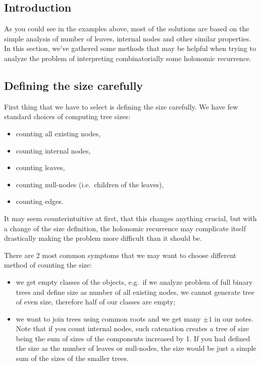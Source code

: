 \documentclass[final]{article}
\theoremstyle{definition}
\theoremstyle{remark}
\begin{document}
\subsection{Introduction}%
\label{sub:introduction}

As you could see in the examples above, most of the solutions are based on the simple analysis of number of leaves, internal nodes and other similar properties. In this section, we've gathered some methods that may be helpful when trying to analyze the problem of interpreting combinatorially some holonomic recurrence.

\subsection{Defining the size carefully}%
\label{sub:defining_the_size_carefully}

First thing that we have to select is defining the size carefully. We have few standard choices of computing tree sizes:
\begin{itemize}
    \item counting all existing nodes,
    \item counting internal nodes,
    \item counting leaves,
    \item counting null-nodes (i.e.\ children of the leaves),
    \item counting edges.
\end{itemize}

It may seem counterintuitive at first, that this changes anything crucial, but with a change of the size definition, the holonomic recurrence may complicate itself drastically making the problem more difficult than it should be.

There are 2 most common symptoms that we may want to choose different method of counting the size:
\begin{itemize}
    \item we get empty classes of the objects, e.g.\ if we analyze problem of full binary trees and define size as number of all existing nodes, we cannot generate tree of even size, therefore half of our classes are empty;
    \item we want to join trees using common roots and we get many \(\pm1\) in our notes. Note that if you count internal nodes, such catenation creates a tree of size being the sum of sizes of the components increased by 1. If you had defined the size as the number of leaves or null-nodes, the size would be just a simple sum of the sizes of the smaller trees.
\end{itemize}
\end{document}
